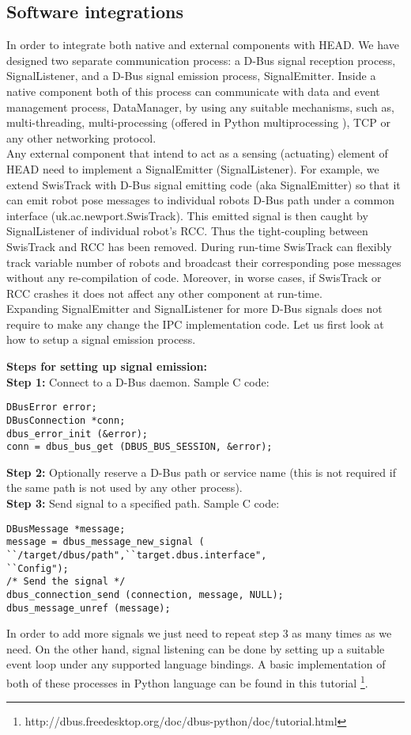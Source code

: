\subsection{Software integrations}
In order to integrate both native and external components with HEAD. We have designed two separate communication process: a D-Bus signal reception process, SignalListener, and a D-Bus signal emission process, SignalEmitter. Inside a native component both of this process can communicate with data and event management process, DataManager, by using any suitable mechanisms, such as, multi-threading, multi-processing (offered in Python multiprocessing ), TCP or any other networking protocol.\\
Any external component that intend to act as a sensing (actuating) element of HEAD need to implement a SignalEmitter (SignalListener). For example, we extend SwisTrack with D-Bus signal emitting code (aka SignalEmitter) so that it can emit robot pose messages to individual robots D-Bus path under a common interface (uk.ac.newport.SwisTrack). This emitted signal is then caught by SignalListener of individual robot's RCC. Thus the tight-coupling between SwisTrack and RCC has been removed. During run-time SwisTrack can flexibly track variable number of robots and broadcast their corresponding pose messages without any re-compilation of code. Moreover, in worse cases, if SwisTrack or RCC crashes it does not affect any other component at run-time.\\
Expanding SignalEmitter and SignalListener for more D-Bus signals does not require to make any change the IPC implementation code. Let us first look at how to setup a signal emission process.

\textbf{Steps for setting up signal emission:}\\
\textbf{Step 1:} Connect to a D-Bus daemon. Sample C code:
\lstset{language=C,basicstyle=\small}
\begin{lstlisting}
DBusError error;
DBusConnection *conn;
dbus_error_init (&error);
conn = dbus_bus_get (DBUS_BUS_SESSION, &error);
\end{lstlisting}
\textbf{Step 2:} Optionally reserve a D-Bus path or service name (this is not required if the same path is not used by any other process).\\
\textbf{Step 3:} Send signal to a specified path. Sample C code:
\begin{lstlisting} 
DBusMessage *message;
message = dbus_message_new_signal (
``/target/dbus/path",``target.dbus.interface",
``Config");
/* Send the signal */
dbus_connection_send (connection, message, NULL);
dbus_message_unref (message);
\end{lstlisting}
In order to add more signals we just need to repeat step 3 as many times as we need. On the other hand, signal listening can be done by setting up a suitable event loop under any supported language bindings. A basic implementation of both of these processes in Python language can be found in this tutorial \footnote{http://dbus.freedesktop.org/doc/dbus-python/doc/tutorial.html}. 

